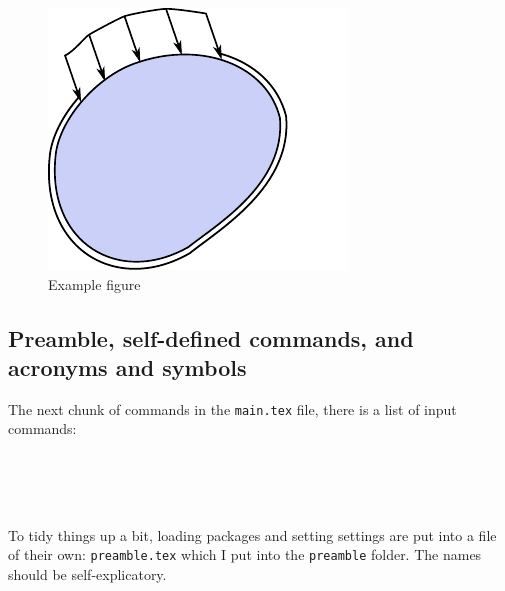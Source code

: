 \begin{figure}
	\centering
	\includegraphics{./images/bcs.pdf}
	\caption{Example figure}
	\label{fig:example}
\end{figure}

\subsection{Preamble, self-defined commands, and acronyms and symbols}

The next chunk of commands in the \texttt{main.tex} file, there is a list of input commands:
\begin{lstlisting}




\end{lstlisting}
To tidy things up a bit, loading packages and setting settings are put into a file of their own: \texttt{preamble.tex} which I put into the \texttt{preamble} folder. The names should be self-explicatory.

